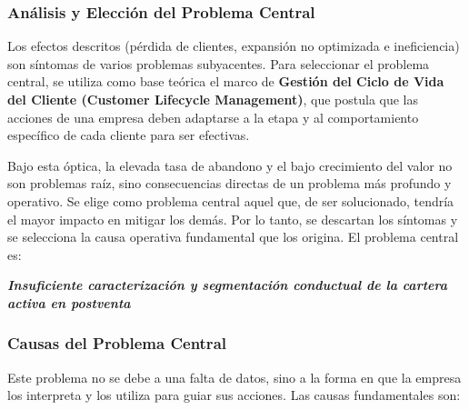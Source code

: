 
\subsubsection{Análisis y Elección del Problema Central}
Los efectos descritos (pérdida de clientes, expansión no optimizada e ineficiencia) son síntomas de varios problemas subyacentes. Para seleccionar el problema central, se utiliza como base teórica el marco de \textbf{Gestión del Ciclo de Vida del Cliente (Customer Lifecycle Management)}, que postula que las acciones de una empresa deben adaptarse a la etapa y al comportamiento específico de cada cliente para ser efectivas.

Bajo esta óptica, la elevada tasa de abandono y el bajo crecimiento del valor no son problemas raíz, sino consecuencias directas de un problema más profundo y operativo. Se elige como problema central aquel que, de ser solucionado, tendría el mayor impacto en mitigar los demás. Por lo tanto, se descartan los síntomas y se selecciona la causa operativa fundamental que los origina. El problema central es:

\begin{center}
    \textbf{\textit{Insuficiente caracterización y segmentación conductual de la cartera activa en postventa}}
\end{center}

\subsubsection{Causas del Problema Central}
Este problema no se debe a una falta de datos, sino a la forma en que la empresa los interpreta y los utiliza para guiar sus acciones. Las causas fundamentales son:

